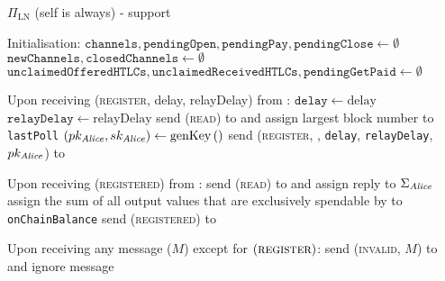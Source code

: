\begin{protocolbox}{$\Pi_{\mathrm{LN}}$ (self is \alice{} always) - support}
  \label{alg:protocol:support}
  \begin{algorithmic}[1]
    \State Initialisation:
    \Indent
      \State $\mathtt{channels}, \mathtt{pendingOpen}, \mathtt{pendingPay},
      \mathtt{pendingClose} \gets \emptyset$
      \State $\mathtt{newChannels}, \mathtt{closedChannels} \gets \emptyset$
      \State $\mathtt{unclaimedOfferedHTLCs}, \mathtt{unclaimedReceivedHTLCs},
      \mathtt{pendingGetPaid} \gets \emptyset$
    \EndIndent
    \State

    \State Upon receiving (\textsc{register}, delay, relayDelay) from
    \environment:
    \Indent
      \State $\mathtt{delay} \gets \mathrm{delay}$
      \label{alg:protocol:support:delay}
      \State $\mathtt{relayDelay} \gets \mathrm{relayDelay}$
      \State send (\textsc{read}) to \ledger{} and assign largest block number
      to \texttt{lastPoll}
      \label{alg:protocol:support:lastpoll}
      \State $\left(pk_{\mathit{Alice}}, sk_{\mathit{Alice}}\right) \gets
      \mathrm{genKey}\left(\right)$
      \label{alg:protocol:support:keygen}
      \State send (\textsc{register}, \alice, \texttt{delay},
      \texttt{relayDelay}, $pk_{\mathit{Alice}}$) to \environment
    \EndIndent
    \State

    \State Upon receiving (\textsc{registered}) from \environment:
    \Indent
      \State send (\textsc{read}) to \ledger{} and assign reply to
      $\Sigma_{\mathit{Alice}}$
      \State assign the sum of all output values that are exclusively spendable
      by \alice{} to \texttt{onChainBalance}
      \State send (\textsc{registered}) to \environment
    \EndIndent
    \State

    \State Upon receiving any message ($M$) except for
    $\left(\textsc{register}\right)$:
    \Indent
        \State send (\textsc{invalid}, $M$) to \environment{} and ignore message
      \EndIf
    \EndIndent
    \State


\end{algorithmic}
\end{protocolbox}
